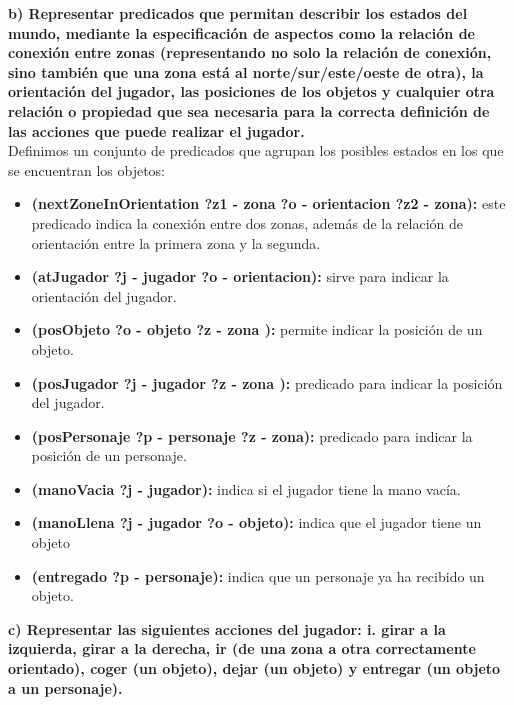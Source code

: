 \documentclass[12pt]{article}
\begin{document}
\textbf{b) Representar predicados que permitan describir los estados del mundo,
mediante la especificación de aspectos como la relación de conexión entre
zonas (representando no solo la relación de conexión, sino también que una
zona está al norte/sur/este/oeste de otra), la orientación del jugador, las
posiciones de los objetos y cualquier otra relación o propiedad que sea
necesaria para la correcta definición de las acciones que puede realizar el
jugador.}\\

Definimos un conjunto de predicados que agrupan los posibles estados en los que se encuentran los objetos:
\begin{itemize}
	\item \textbf{(nextZoneInOrientation ?z1 - zona ?o - orientacion ?z2 - zona):} este predicado indica la conexión entre dos zonas, además de la relación de orientación entre la primera zona y la segunda.
	\item \textbf{(atJugador ?j - jugador ?o - orientacion):} sirve para indicar la orientación del jugador.
	\item \textbf{(posObjeto ?o - objeto ?z - zona ):} permite indicar la posición de un objeto.
	\item \textbf{(posJugador ?j - jugador ?z - zona ):} predicado para indicar la posición del jugador.
	\item \textbf{(posPersonaje ?p - personaje ?z - zona):} predicado para indicar la posición de un personaje.
	\item \textbf{(manoVacia ?j - jugador):} indica si el jugador tiene la mano vacía.
	\item \textbf{(manoLlena ?j - jugador ?o - objeto):} indica que el jugador tiene un objeto
	\item \textbf{(entregado ?p - personaje):} indica que un personaje ya ha recibido un objeto.
	
     
\end{itemize}

\textbf{c) Representar las siguientes acciones del jugador:
i. girar a la izquierda, girar a la derecha, ir (de una zona a otra
correctamente orientado), coger (un objeto), dejar (un objeto) y
entregar (un objeto a un personaje).}
\end{document}
